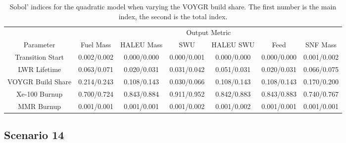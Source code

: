 \begin{table}
    \centering
    \caption{Sobol' indices for the quadratic model when varying the VOYGR 
    build share. The first number is the main index, the second is the total 
    index.}
    \label{tab:s7_sobol_voygr_quadratic}
    \begin{tabular}{c c c c c c c}
        \hline
        & \multicolumn{6}{c}{Output Metric} \\
        Parameter & Fuel Mass & HALEU Mass & SWU & HALEU SWU & Feed & SNF Mass \\
        \hline
        Transition Start & 0.002/0.002 & 0.000/0.000 & 0.000/0.001 &
                           0.000/0.000 & 0.000/0.000 & 0.001/0.002\\
        LWR Lifetime & 0.063/0.071 & 0.020/0.031 & 0.031/0.042 &
                       0.051/0.031 & 0.020/0.031 & 0.066/0.075\\
        VOYGR Build Share & 0.214/0.243 & 0.108/0.143 & 0.030/0.066 &
                            0.108/0.143 & 0.108/0.143 & 0.170/0.200\\
        Xe-100 Burnup & 0.700/0.724 & 0.843/0.884 & 0.911/0.952 &
                        0.842/0.883 & 0.843/0.883 & 0.740/0.767\\
        MMR Burnup & 0.001/0.001 & 0.001/0.001 & 0.001/0.002 &
                     0.001/0.002 & 0.001/0.001 & 0.001/0.001\\
        \hline        
    \end{tabular}
\end{table}


\subsection{Scenario 14}


